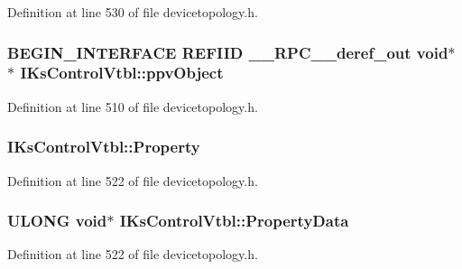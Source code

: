Definition at line 530 of file devicetopology.\+h.

\subsubsection[{\texorpdfstring{ppv\+Object}{ppvObject}}]{\setlength{\rightskip}{0pt plus 5cm}B\+E\+G\+I\+N\+\_\+\+I\+N\+T\+E\+R\+F\+A\+CE {\bf R\+E\+F\+I\+ID} {\bf \+\_\+\+\_\+\+R\+P\+C\+\_\+\+\_\+deref\+\_\+out} {\bf void}$\ast$$\ast$ I\+Ks\+Control\+Vtbl\+::ppv\+Object}\hypertarget{struct_i_ks_control_vtbl_af294a71f21f5ac3b91b33d5d16d6c22c}{}\label{struct_i_ks_control_vtbl_af294a71f21f5ac3b91b33d5d16d6c22c}


Definition at line 510 of file devicetopology.\+h.

\subsubsection[{\texorpdfstring{Property}{Property}}]{ I\+Ks\+Control\+Vtbl\+::\+Property}\hypertarget{struct_i_ks_control_vtbl_af237693984e6ddd442f6d54e43eaa34b}{}\label{struct_i_ks_control_vtbl_af237693984e6ddd442f6d54e43eaa34b}


Definition at line 522 of file devicetopology.\+h.

\subsubsection[{\texorpdfstring{Property\+Data}{PropertyData}}]{ {\bf U\+L\+O\+NG} {\bf void}$\ast$ I\+Ks\+Control\+Vtbl\+::\+Property\+Data}\hypertarget{struct_i_ks_control_vtbl_a7ea466a7929adb9a77169a60b2aa0963}{}\label{struct_i_ks_control_vtbl_a7ea466a7929adb9a77169a60b2aa0963}


Definition at line 522 of file devicetopology.\+h.

